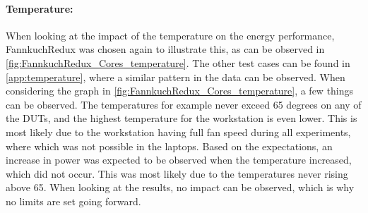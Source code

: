 

\paragraph{Temperature:} When looking at the impact of the temperature on the energy performance, FannkuchRedux was chosen again to illustrate this, as can be observed in \cref{fig:FannkuchRedux_Cores_temperature}. The other test cases can be found in \cref{app:temperature}, where a similar pattern in the data can be observed. When considering the graph in \cref{fig:FannkuchRedux_Cores_temperature}, a few things can be observed. The temperatures for example never exceed 65 degrees on any of the DUTs, and the highest temperature for the workstation is even lower. This is most likely due to the workstation having full fan speed during all experiments, where which was not possible in the laptops. Based on the expectations, an increase in power was expected to be observed when the temperature increased, which did not occur. This was most likely due to the temperatures never rising above 65. When looking at the results, no impact can be observed, which is why no limits are set going forward.





